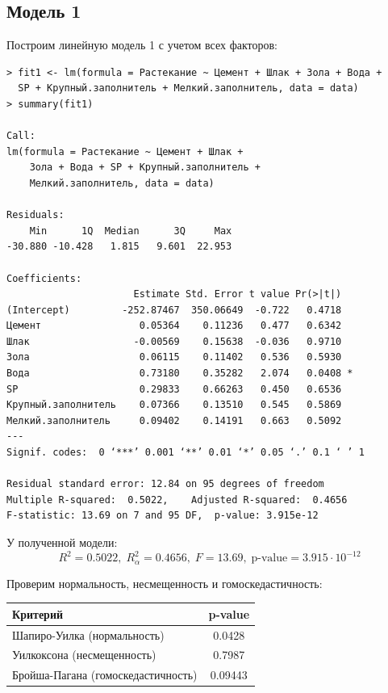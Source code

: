 \documentclass[10pt]{article}
\begin{document}
\subsection{Модель 1}

Построим линейную модель 1 с учетом всех факторов:

\begin{verbatim}
> fit1 <- lm(formula = Растекание ~ Цемент + Шлак + Зола + Вода +
  SP + Крупный.заполнитель + Мелкий.заполнитель, data = data)
> summary(fit1)

Call:
lm(formula = Растекание ~ Цемент + Шлак + 
    Зола + Вода + SP + Крупный.заполнитель + 
    Мелкий.заполнитель, data = data)

Residuals:
    Min      1Q  Median      3Q     Max 
-30.880 -10.428   1.815   9.601  22.953 

Coefficients:
                      Estimate Std. Error t value Pr(>|t|)  
(Intercept)         -252.87467  350.06649  -0.722   0.4718  
Цемент                 0.05364    0.11236   0.477   0.6342  
Шлак                  -0.00569    0.15638  -0.036   0.9710  
Зола                   0.06115    0.11402   0.536   0.5930  
Вода                   0.73180    0.35282   2.074   0.0408 *
SP                     0.29833    0.66263   0.450   0.6536  
Крупный.заполнитель    0.07366    0.13510   0.545   0.5869  
Мелкий.заполнитель     0.09402    0.14191   0.663   0.5092  
---
Signif. codes:  0 ‘***’ 0.001 ‘**’ 0.01 ‘*’ 0.05 ‘.’ 0.1 ‘ ’ 1

Residual standard error: 12.84 on 95 degrees of freedom
Multiple R-squared:  0.5022,	Adjusted R-squared:  0.4656 
F-statistic: 13.69 on 7 and 95 DF,  p-value: 3.915e-12
\end{verbatim}

У полученной модели:
$$
  R^2 = 0.5022, \; R^2_{\alpha} = 0.4656, \; F = 13.69, \; \text{p-value} = 3.915 \cdot 10^{-12}
$$

Проверим нормальность, несмещенность и гомоскедастичность:

\bigskip

\begin{tabularx}{\textwidth}{ |X|c| }
  \hline
  Критерий & p-value \\
  \hline
  Шапиро-Уилка (нормальность) & 0.0428 \\
  \hline
  Уилкоксона (несмещенность) & 0.7987 \\
  \hline
  Бройша-Пагана (гомоскедастичность) & 0.09443 \\
  \hline
\end{tabularx}
\end{document}

